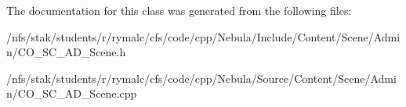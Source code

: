 The documentation for this class was generated from the following files:\begin{DoxyCompactItemize}
\item 
/nfs/stak/students/r/rymalc/cfs/code/cpp/Nebula/Include/Content/Scene/Admin/CO\_\-SC\_\-AD\_\-Scene.h\item 
/nfs/stak/students/r/rymalc/cfs/code/cpp/Nebula/Source/Content/Scene/Admin/CO\_\-SC\_\-AD\_\-Scene.cpp\end{DoxyCompactItemize}

